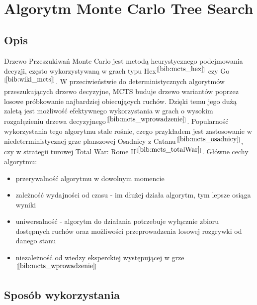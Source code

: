 \section{Algorytm Monte Carlo Tree Search}
\label{sec:mcts}

\subsection{Opis}

Drzewo Przeszukiwań Monte Carlo jest metodą heurystycznego podejmowania decyzji, często wykorzystywaną w grach typu Hex$^{[\ref{bib:mcts_hex}]}$ czy Go$^{[\ref{bib:wiki_mcts}]}$. W przeciwieństwie do deterministycznych algorytmów przeszukujących drzewo decyzyjne, MCTS buduje drzewo wariantów poprzez losowe próbkowanie najbardziej obiecujących ruchów. Dzięki temu jego dużą zaletą jest możliwość efektywnego wykorzystania w grach o wysokim rozgałęzieniu drzewa decyzyjnego$^{[\ref{bib:mcts_wprowadzenie}]}$. Popularność wykorzystania tego algorytmu stale rośnie, czego przykładem jest zastosowanie w niedeterministycznej grze planszowej Osadnicy z Catanu$^{[\ref{bib:mcts_osadnicy}]}$, czy w strategii turowej Total War: Rome II$^{[\ref{bib:mcts_totalWar}]}$. Główne cechy algorytmu:
\begin{itemize}
	\item przerywalność algorytmu w dowolnym momencie
	\item zależność wydajności od czasu - im dłużej działa algorytm, tym lepsze osiąga wyniki
	\item uniwersalność - algorytm do działania potrzebuje wyłącznie zbioru dostępnych ruchów oraz możliwości przeprowadzenia losowej rozgrywki od danego stanu
	\item niezależność od wiedzy eksperckiej występującej w grze $^{[\ref{bib:mcts_wprowadzenie}]}$
\end{itemize}

\subsection{Sposób wykorzystania}

